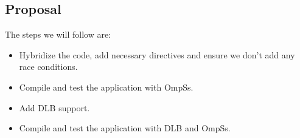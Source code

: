 \subsection{Proposal}
The steps we will follow are:
\begin{itemize}
  \item Hybridize the code, add necessary directives and ensure we don't add any race conditions.
  \item Compile and test the application with OmpSs.
  \item Add DLB support.
  \item Compile and test the application with DLB and OmpSs.
\end{itemize}
